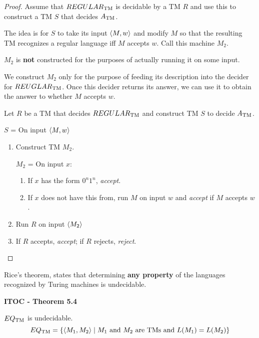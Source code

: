 \begin{mdframed}
\begin{proof}
Assume that $REGULAR_{\text{TM}}$ is decidable by a TM $R$ and use this to construct a TM $S$ that decides $A_{\text{TM}}$.

The idea is for $S$ to take its input $\langle{M, w}\rangle$ and modify $M$ so that the resulting TM recognizes a regular language iff $M$ accepts $w$. Call this machine $M_2$.

{\color{blue} $M_2$ is \textbf{not} constructed for the purposes of actually running it on some input.} 

We construct $M_2$ only for the purpose of feeding its description into the decider for $REUGLAR_{\text{TM}}$. Once this decider returns its answer, we can use it to obtain the answer to whether $M$ accepts $w$.

Let $R$ be a TM that decides $REGULAR_{\text{TM}}$ and construct TM $S$ to decide $A_{\text{TM}}$.

\medskip
$S$ = On input $\langle{M, w}\rangle$
\begin{enumerate}
\item Construct TM $M_2$.

$M_2$ = On input $x$:
\begin{enumerate}
\item If $x$ has the form $0^n1^n$, \textit{accept}.
\item If $x$ does not have this from, run $M$ on input $w$ and \textit{accept} if $M$ accepts $w$.
\end{enumerate}
\item Run $R$ on input $\langle{M_2}\rangle$
\item If $R$ accepts, \textit{accept}; if $R$ rejects, \textit{reject}.
\end{enumerate}
\end{proof}
\end{mdframed}

Rice's theorem, states that determining \textbf{any property} of the languages recognized by Turing machines is undecidable.

\label{lang:EQTM_UDCDB}
\begin{shaded}
\textbf{ITOC - Theorem 5.4}

\medskip
$EQ_{\text{TM}}$ is undecidable.
\[
EQ_{\text{TM}} = \{\langle{M_1, M_2}\rangle \mid \text{$M_1$ and $M_2$ are TMs and }  L(M_1) = L(M_2) \}
\]
\end{shaded}


